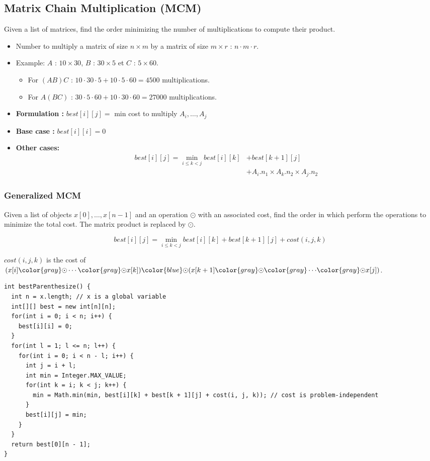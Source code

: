 \subsection{Matrix Chain Multiplication (MCM)}
Given a list of matrices, find the order minimizing the number of multiplications to compute their product.
\begin{itemize}
 \item Number to multiply a matrix of size $n \times m$ by a matrix of size $m \times r$ : $n \cdot m \cdot r$.

 \item Example: $A$ : $10 \times 30$, $B$ : $30 \times 5$ et $C$ : $5 \times 60$.
 \begin{itemize}
 \item For $(AB)C$ : $10 \cdot 30 \cdot 5 + 10 \cdot 5 \cdot 60 = 4500$ multiplications.
 \item For $A(BC)$ : $30 \cdot 5 \cdot 60 + 10 \cdot 30 \cdot 60 = 27000$ multiplications.
  \end{itemize}
\end{itemize}

\begin{itemize}
 \item \textbf{Formulation :}
 $best[i][j] =$ min cost to multiply $A_i, \ldots, A_j$
 \item \textbf{Base case :} $best[i][i] = 0 $
 \item \textbf{Other cases:}
 \begin{align*}
 best[i][j] = \min_{i \leq k < j} best[i][k] & + best[k + 1][j] \\
                                             & + A_i.n_1 \times A_k.n_2 \times A_j.n_2
 \end{align*}
\end{itemize}

\subsubsection{Generalized MCM}
Given a list of objects $x[0], \ldots, x[n - 1]$ and an operation $\odot$ with an associated cost, find the order in which perform the operations to minimize the total cost. The matrix product is replaced by $\odot$.

$$ best[i][j] = \min_{i \leq k < j} best[i][k] + best[k + 1][j] + cost(i, j, k)$$

$cost(i, j, k)$ is the cost of $(x[i] {\color{gray} \odot} \cdots {\color{gray} \odot} x[k]) {\color{blue} \mathbf{\odot}} (x[k + 1] {\color{gray} \odot} {\color{gray} \cdots} {\color{gray} \odot} x[j])$.

\begin{lstlisting}
int bestParenthesize() {
  int n = x.length; // x is a global variable
  int[][] best = new int[n][n];
  for(int i = 0; i < n; i++) { 
    best[i][i] = 0;
  }
  for(int l = 1; l <= n; l++) {
    for(int i = 0; i < n - l; i++) {
      int j = i + l;
      int min = Integer.MAX_VALUE;
      for(int k = i; k < j; k++) {
        min = Math.min(min, best[i][k] + best[k + 1][j] + cost(i, j, k)); // cost is problem-independent
      }
      best[i][j] = min;
    }
  }
  return best[0][n - 1];
} 
\end{lstlisting}
